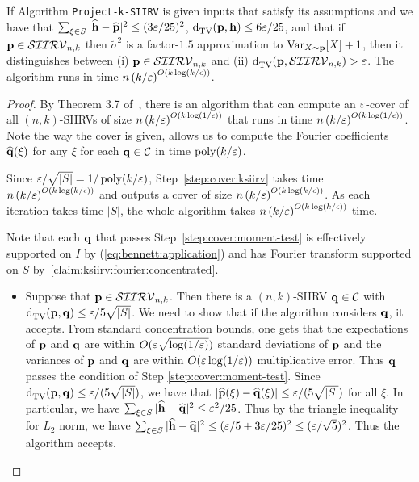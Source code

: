 \begin{lemma} If Algorithm \texttt{Project-k-SIIRV} is given inputs that satisfy its assumptions and we have that $\sum_{\xi \in S} |\fourier{\h}-\fourier{\p}|^2 \leq (3\eps/25)^2$, $\totalvardist{\p}{\h} \leq 6\eps/25$, and that if $\p\in\classksiirv[n]{k}$ then $\widetilde{\sigma}^2$ is a factor-$1.5$ approximation to $\var_{X \sim \p}[X]+1$, then it distinguishes between (i) $\p\in\classksiirv[n]{k}$ and (ii) $ \totalvardist{\p}{\classksiirv[n]{k}}>\eps$. The algorithm runs in time $n\left( k/\eps \right)^{O(k\log(k/\epsilon))}$.\end{lemma}
\begin{proof}
By Theorem 3.7 of~\cite{DKS:15}, there is an algorithm that can compute an $\eps$-cover of all $(n,k)$-SIIRVs of size $n\left( k/\eps \right)^{O(k\log(1/\epsilon))}$ that runs in time $n\left( k/\eps \right)^{O(k\log(1/\epsilon))}$. Note the way the cover is given, allows us to compute the Fourier coefficients $\fourier{\q}(\xi)$ for any $\xi$ for each $\q \in \mathcal{C}$ in time $\poly(k/\eps)$.

 Since $\eps/\sqrt{|S|}=1/\poly(k/\eps)$, Step~\ref{step:cover:ksiirv} takes time $n\left( k/\eps \right)^{O(k\log(k/\epsilon))}$ and outputs a cover of size $n\left( k/\eps \right)^{O(k\log(k/\epsilon))}$. As each iteration takes time $|S|$, the whole algorithm takes $n\left( k/\eps \right)^{O(k\log(k/\epsilon))}$ time.

Note that each $\q$ that passes Step~\ref{step:cover:moment-test} is effectively supported on $I$ by (\ref{eq:bennett:application}) and has Fourier transform supported on $S$ by~\cref{claim:ksiirv:fourier:concentrated}.

\begin{itemize}
  \item Suppose that $\p\in\classksiirv[n]{k}$. Then there is a $(n,k)$-SIIRV $\q \in \mathcal{C}$ with $ \totalvardist{\p}{\q} \leq {\eps}/{5\sqrt{|S|}}$.
We need to show that if the algorithm considers $\q$, it accepts. From standard concentration bounds, one gets that the expectations of $\p$ and $\q$ are within $O(\eps\sqrt{\log(1/\eps)})$ standard deviations of $\p$ and the variances of $\p$ and $\q$ are within $O(\eps\log(1/\eps))$ multiplicative error.
Thus $\q$ passes the condition of Step \ref{step:cover:moment-test}. Since $ \totalvardist{\p}{\q} \leq \eps/(5\sqrt{|S|})$, we have that $|\fourier{\p}(\xi)-\fourier{\q}(\xi)| \leq \eps/(5\sqrt{|S|})$ for all $\xi$.
In particular, we have $\sum_{\xi \in S} |\fourier{\h}-\fourier{\q}|^2 \leq \eps^2/25$. Thus by the triangle inequality for $L_2$ norm, we have  $\sum_{\xi \in S} |\fourier{\h}-\fourier{\q}|^2 \leq (\eps/5 + 3\eps/25)^2 \leq (\eps/\sqrt{5})^2$. Thus the algorithm accepts.


\end{itemize}
\end{proof}
